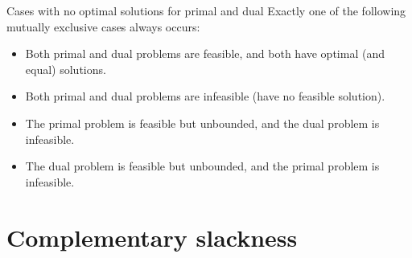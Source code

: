 \documentclass[c]{beamer}
\begin{document}
\begin{frame}{Cases with no optimal solutions for primal and dual}
  Exactly one of the following mutually exclusive cases always occurs:
  \begin{itemize}
    \item Both primal and dual problems are feasible, and both have optimal (and equal) solutions.
    \item Both primal and dual problems are infeasible (have no feasible solution).
    \item The primal problem is feasible but unbounded, and the dual problem is infeasible.
    \item The dual problem is feasible but unbounded, and the primal problem is infeasible.
  \end{itemize}
\end{frame}

\section{Complementary slackness}
\end{document}
